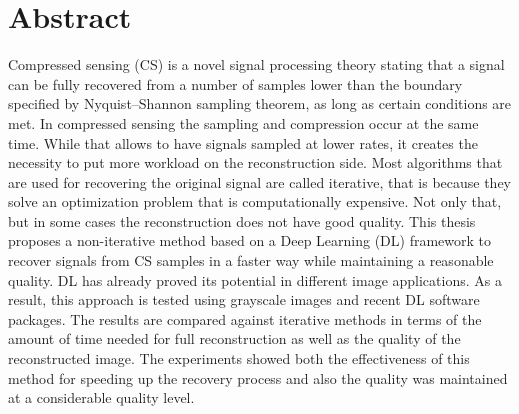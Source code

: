 

\cleardoublepage
\chapter*{Abstract}
Compressed sensing (CS) is a novel signal processing theory stating that a signal can be fully recovered from a number of samples lower than the boundary specified by Nyquist–Shannon sampling theorem, as long as certain conditions are met. In compressed sensing the sampling and compression occur at the same time. While that allows to have signals sampled at lower rates, it creates the necessity to put more workload on the reconstruction side. Most algorithms that are used for recovering the original signal are called iterative, that is because they solve an optimization problem that is computationally expensive. Not only that, but in some cases the reconstruction does not have good quality. This thesis proposes a non-iterative method based on a Deep Learning (DL) framework to recover signals from CS samples in a faster way while maintaining a reasonable quality. DL has already proved its potential in different image applications. As a result, this approach is tested using grayscale images and recent DL software packages. The results are compared against iterative methods in terms of the amount of time needed for full reconstruction as well as the quality of the reconstructed image. The experiments showed both the effectiveness of this method for speeding up the recovery process and also the quality was maintained at a considerable quality level.  
\vskip0.5cm









